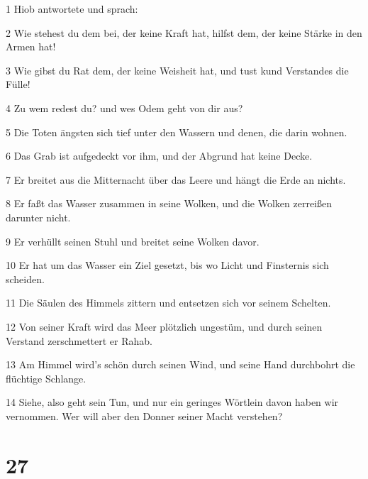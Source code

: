 \par 1 Hiob antwortete und sprach:
\par 2 Wie stehest du dem bei, der keine Kraft hat, hilfst dem, der keine Stärke in den Armen hat!
\par 3 Wie gibst du Rat dem, der keine Weisheit hat, und tust kund Verstandes die Fülle!
\par 4 Zu wem redest du? und wes Odem geht von dir aus?
\par 5 Die Toten ängsten sich tief unter den Wassern und denen, die darin wohnen.
\par 6 Das Grab ist aufgedeckt vor ihm, und der Abgrund hat keine Decke.
\par 7 Er breitet aus die Mitternacht über das Leere und hängt die Erde an nichts.
\par 8 Er faßt das Wasser zusammen in seine Wolken, und die Wolken zerreißen darunter nicht.
\par 9 Er verhüllt seinen Stuhl und breitet seine Wolken davor.
\par 10 Er hat um das Wasser ein Ziel gesetzt, bis wo Licht und Finsternis sich scheiden.
\par 11 Die Säulen des Himmels zittern und entsetzen sich vor seinem Schelten.
\par 12 Von seiner Kraft wird das Meer plötzlich ungestüm, und durch seinen Verstand zerschmettert er Rahab.
\par 13 Am Himmel wird's schön durch seinen Wind, und seine Hand durchbohrt die flüchtige Schlange.
\par 14 Siehe, also geht sein Tun, und nur ein geringes Wörtlein davon haben wir vernommen. Wer will aber den Donner seiner Macht verstehen?

\chapter{27}

